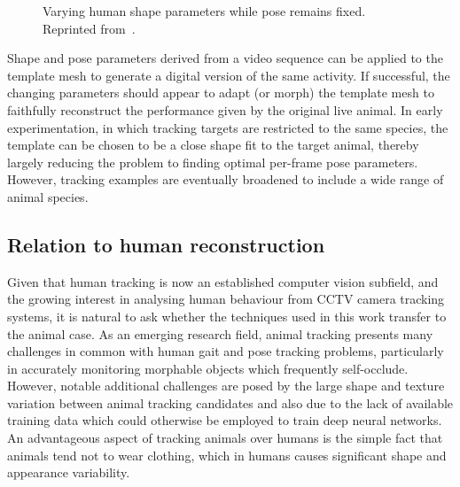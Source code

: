     \begin{figure}[H] %
        \caption{Varying human shape parameters while pose remains fixed. Reprinted from~\cite{Streuber:SIGGRAPH:2016}.}
        \label{fig:black_shape}
    \end{figure}
    
    Shape and pose parameters derived from a video sequence can be applied to the template mesh to generate a digital version of the same activity. If successful, the changing parameters should appear to adapt (or morph) the template mesh to faithfully reconstruct the performance given by the original live animal. In early experimentation, in which tracking targets are restricted to the same species, the template can be chosen to be a close shape fit to the target animal, thereby largely reducing the problem to finding optimal per-frame pose parameters. However, tracking examples are eventually broadened to include a wide range of animal species.

    \subsection{Relation to human reconstruction}
    Given that human tracking is now an established computer vision subfield, and the growing interest in analysing human behaviour from CCTV camera tracking systems, it is natural to ask whether the techniques used in this work transfer to the animal case. As an emerging research field, animal tracking presents many challenges in common with human gait and pose tracking problems, particularly in accurately monitoring morphable objects which frequently self-occlude. However, notable additional challenges are posed by the large shape and texture variation between animal tracking candidates and also due to the lack of available training data which could otherwise be employed to train deep neural networks. An advantageous aspect of tracking animals over humans is the simple fact that animals tend not to wear clothing, which in humans causes significant shape and appearance variability.

